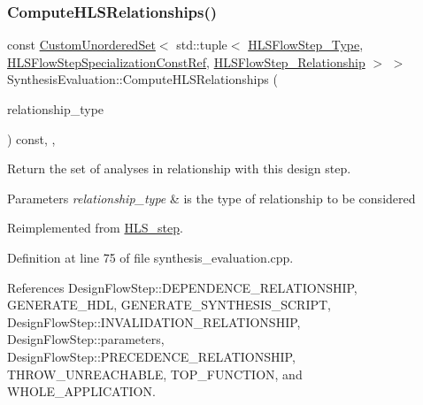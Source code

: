 \subsubsection{\texorpdfstring{Compute\+H\+L\+S\+Relationships()}{ComputeHLSRelationships()}}
{\footnotesize\ttfamily const \hyperlink{classCustomUnorderedSet}{Custom\+Unordered\+Set}$<$ std\+::tuple$<$ \hyperlink{hls__step_8hpp_ada16bc22905016180e26fc7e39537f8d}{H\+L\+S\+Flow\+Step\+\_\+\+Type}, \hyperlink{hls__step_8hpp_a5fdd2edf290c196531d21d68e13f0e74}{H\+L\+S\+Flow\+Step\+Specialization\+Const\+Ref}, \hyperlink{hls__step_8hpp_a3ad360b9b11e6bf0683d5562a0ceb169}{H\+L\+S\+Flow\+Step\+\_\+\+Relationship} $>$ $>$ Synthesis\+Evaluation\+::\+Compute\+H\+L\+S\+Relationships (\begin{DoxyParamCaption}\item[{const \hyperlink{classDesignFlowStep_a723a3baf19ff2ceb77bc13e099d0b1b7}{Design\+Flow\+Step\+::\+Relationship\+Type}}]{relationship\+\_\+type }\end{DoxyParamCaption}) const\hspace{0.3cm}{\ttfamily [override]}, {\ttfamily [protected]}, {\ttfamily [virtual]}}



Return the set of analyses in relationship with this design step. 


\begin{DoxyParams}{Parameters}
{\em relationship\+\_\+type} & is the type of relationship to be considered \\
\hline
\end{DoxyParams}


Reimplemented from \hyperlink{classHLS__step_aed0ce8cca9a1ef18e705fc1032ad4de5}{H\+L\+S\+\_\+step}.



Definition at line 75 of file synthesis\+\_\+evaluation.\+cpp.



References Design\+Flow\+Step\+::\+D\+E\+P\+E\+N\+D\+E\+N\+C\+E\+\_\+\+R\+E\+L\+A\+T\+I\+O\+N\+S\+H\+IP, G\+E\+N\+E\+R\+A\+T\+E\+\_\+\+H\+DL, G\+E\+N\+E\+R\+A\+T\+E\+\_\+\+S\+Y\+N\+T\+H\+E\+S\+I\+S\+\_\+\+S\+C\+R\+I\+PT, Design\+Flow\+Step\+::\+I\+N\+V\+A\+L\+I\+D\+A\+T\+I\+O\+N\+\_\+\+R\+E\+L\+A\+T\+I\+O\+N\+S\+H\+IP, Design\+Flow\+Step\+::parameters, Design\+Flow\+Step\+::\+P\+R\+E\+C\+E\+D\+E\+N\+C\+E\+\_\+\+R\+E\+L\+A\+T\+I\+O\+N\+S\+H\+IP, T\+H\+R\+O\+W\+\_\+\+U\+N\+R\+E\+A\+C\+H\+A\+B\+LE, T\+O\+P\+\_\+\+F\+U\+N\+C\+T\+I\+ON, and W\+H\+O\+L\+E\+\_\+\+A\+P\+P\+L\+I\+C\+A\+T\+I\+ON.

